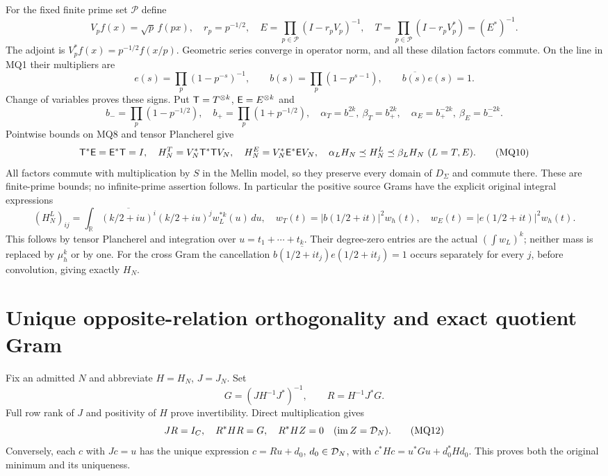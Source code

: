For the fixed finite prime set $\mathcal P$ define
\[
 V_pf(x)=\sqrt p\,f(px),\quad r_p=p^{-1/2},\quad
 E=\prod_{p\in\mathcal P}(I-r_pV_p)^{-1},\quad
 T=\prod_{p\in\mathcal P}(I-r_pV_p^*)=(E^*)^{-1}.             \tag{MQ7}
\]
The adjoint is $V_p^*f(x)=p^{-1/2}f(x/p)$. Geometric series
converge in operator norm, and all these dilation factors commute.
On the line in MQ1 their multipliers are
\[
 e(s)=\prod_p(1-p^{-s})^{-1},\qquad
 b(s)=\prod_p(1-p^{s-1}),\qquad \overline{b(s)}e(s)=1.
                                                               \tag{MQ8}
\]
Change of variables proves these signs. Put
$\mathsf T=T^{\otimes k}$, $\mathsf E=E^{\otimes k}$ and
\[
 b_-=\prod_p(1-p^{-1/2}),\quad b_+=\prod_p(1+p^{-1/2}),\quad
 \alpha_T=b_-^{2k},\ \beta_T=b_+^{2k},\quad
 \alpha_E=b_+^{-2k},\ \beta_E=b_-^{-2k}.                       \tag{MQ9}
\]
Pointwise bounds on MQ8 and tensor Plancherel give
\[
 \mathsf T^*\mathsf E=\mathsf E^*\mathsf T=I,\quad
 H_N^T=V_N^*\mathsf T^*\mathsf T V_N,\quad H_N^E=V_N^*\mathsf E^*\mathsf E V_N,
 \quad \alpha_LH_N\preceq H_N^L\preceq\beta_LH_N\ (L=T,E).
                                                               \tag{MQ10}
\]
All factors commute with multiplication by $S$ in the Mellin model,
so they preserve every domain of $D_\Sigma$ and commute there.
These are finite-prime bounds; no infinite-prime assertion follows.
In particular the positive source Grams have the explicit original
integral expressions
\[
 (H_N^L)_{ij}=\int_{\mathbb R}\overline{(k/2+iu)^i}
          (k/2+iu)^j w_L^{*k}(u)\,du,\quad
 w_T(t)=|b(1/2+it)|^2w_h(t),\quad
 w_E(t)=|e(1/2+it)|^2w_h(t).                              \tag{MQ10a}
\]
This follows by tensor Plancherel and integration over
$u=t_1+\cdots+t_k$. Their degree-zero entries are the actual
$(\int w_L)^k$; neither mass is replaced by $\mu_h^k$ or by one.
For the cross Gram the cancellation
$\overline{b(1/2+it_j)}e(1/2+it_j)=1$ occurs separately for
every $j$, before convolution, giving exactly $H_N$.

\section{Unique opposite-relation orthogonality and exact quotient Gram}
Fix an admitted $N$ and abbreviate $H=H_N$, $J=J_N$. Set
\[
 G=(JH^{-1}J^*)^{-1},\qquad R=H^{-1}J^*G.                    \tag{MQ11}
\]
Full row rank of $J$ and positivity of $H$ prove invertibility.
Direct multiplication gives
\[
 JR=I_C,\quad R^*HR=G,\quad R^*H Z=0
       \quad(\operatorname{im} Z=\mathcal D_N).                                 \tag{MQ12}
\]
Conversely, each $c$ with $Jc=u$ has the unique expression
$c=Ru+d_0$, $d_0\in\mathcal D_N$, with
$c^*Hc=u^*Gu+d_0^*Hd_0$. This proves both the original minimum
and its uniqueness.

